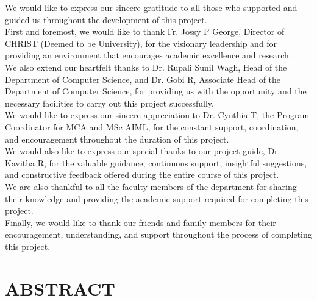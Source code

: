 \documentclass[12pt,a4paper]{report}
\begin{document}
We would like to express our sincere gratitude to all those who supported and guided us throughout the development of this project.\\ 
First and foremost, we would like to thank Fr. Jossy P George, Director of CHRIST (Deemed to be University), for the visionary leadership and for providing an environment that encourages academic excellence and research.\\
We also extend our heartfelt thanks to Dr. Rupali Sunil Wagh, Head of the Department of Computer Science, and Dr. Gobi R, Associate Head of the Department of Computer Science, for providing us with the opportunity and the necessary facilities to carry out this project successfully.\\
We would like to express our sincere appreciation to Dr. Cynthia T, the Program Coordinator for MCA and MSc AIML, for the constant support, coordination, and encouragement throughout the duration of this project.\\
We would also like to express our special thanks to our project guide, Dr. Kavitha R, for the valuable guidance, continuous support, insightful suggestions, and constructive feedback offered during the entire course of this project.\\
We are also thankful to all the faculty members of the department for sharing their knowledge and providing the academic support required for completing this project.\\ 
Finally, we would like to thank our friends and family members for their encouragement, understanding, and support throughout the process of completing this project.


\newpage


\chapter*{ABSTRACT}
\end{document}
